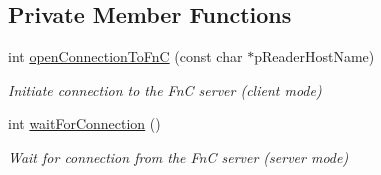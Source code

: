 \subsection*{Private Member Functions}
\begin{DoxyCompactItemize}
\item 
int \hyperlink{class_e_l_f_i_n_1_1_c_connection_fn_c_mgr_a59b5a84c9df6d5e706ada67fc32ad0b5}{open\-Connection\-To\-Fn\-C} (const char $\ast$p\-Reader\-Host\-Name)
\begin{DoxyCompactList}\small\item\em Initiate connection to the Fn\-C server (client mode) \end{DoxyCompactList}\item 
int \hyperlink{class_e_l_f_i_n_1_1_c_connection_fn_c_mgr_af86142cdff404912079d5b48883378ad}{wait\-For\-Connection} ()
\begin{DoxyCompactList}\small\item\em Wait for connection from the Fn\-C server (server mode) \end{DoxyCompactList}\end{DoxyCompactItemize}
